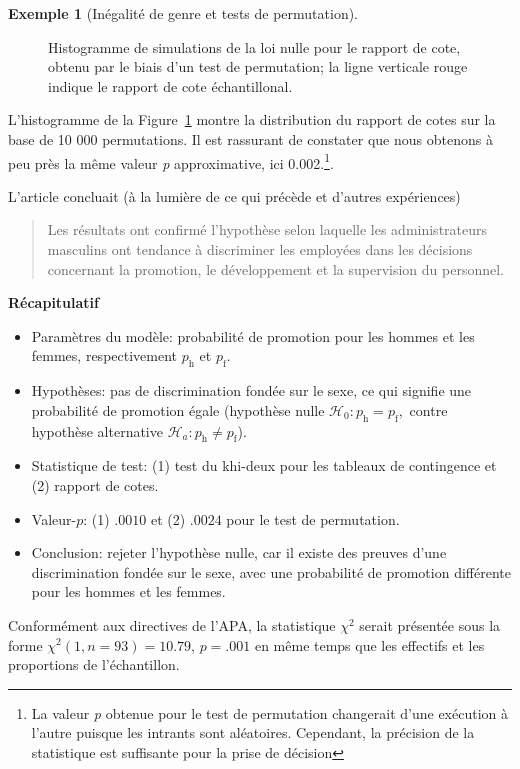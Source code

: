 \documentclass[
  11pt,
  letterpaper,
]{scrbook}
\providecommand{\tightlist}{%
  \setlength{\itemsep}{0pt}\setlength{\parskip}{0pt}}\usepackage{longtable,booktabs,array}
\theoremstyle{plain}
\theoremstyle{plain}
\theoremstyle{definition}
\newtheorem{example}{Exemple}[chapter]
\theoremstyle{definition}
\theoremstyle{remark}
\begin{document}
\begin{example}[Inégalité de genre et tests de
permutation]
\begin{figure}[ht!]
{}

\caption{\label{fig-infer-odds-ratio-permutation}Histogramme de
simulations de la loi nulle pour le rapport de cote, obtenu par le biais
d'un test de permutation; la ligne verticale rouge indique le rapport de
cote échantillonal.}

\end{figure}%

L'histogramme de la Figure~\ref{fig-infer-odds-ratio-permutation} montre
la distribution du rapport de cotes sur la base de 10 000 permutations.
Il est rassurant de constater que nous obtenons à peu près la même
valeur \emph{p} approximative, ici 0.002.\footnote{La valeur \emph{p}
  obtenue pour le test de permutation changerait d'une exécution à
  l'autre puisque les intrants sont aléatoires. Cependant, la précision
  de la statistique est suffisante pour la prise de décision}.

L'article concluait (à la lumière de ce qui précède et d'autres
expériences)

\begin{quote}
Les résultats ont confirmé l'hypothèse selon laquelle les
administrateurs masculins ont tendance à discriminer les employées dans
les décisions concernant la promotion, le développement et la
supervision du personnel.
\end{quote}

\textbf{Récapitulatif}

\begin{itemize}
\tightlist
\item
  Paramètres du modèle: probabilité de promotion pour les hommes et les
  femmes, respectivement \(p_{\text{h}}\) et \(p_{\text{f}}.\)
\item
  Hypothèses: pas de discrimination fondée sur le sexe, ce qui signifie
  une probabilité de promotion égale (hypothèse nulle
  \(\mathscr{H}_0: p_{\text{h}}=p_{\text{f}},\) contre hypothèse
  alternative \(\mathscr{H}_a: p_{\text{h}}\neq p_{\text{f}}\)).
\item
  Statistique de test: (1) test du khi-deux pour les tableaux de
  contingence et (2) rapport de cotes.
\item
  Valeur-\(p\): (1) \(.0010\) et (2) \(.0024\) pour le test de
  permutation.
\item
  Conclusion: rejeter l'hypothèse nulle, car il existe des preuves d'une
  discrimination fondée sur le sexe, avec une probabilité de promotion
  différente pour les hommes et les femmes.
\end{itemize}

Conformément aux directives de l'APA, la statistique \(\chi^2\) serait
présentée sous la forme \(\chi^2(1, n = 93) = 10.79\), \(p = .001\) en
même temps que les effectifs et les proportions de l'échantillon.

\end{example}
\end{document}
